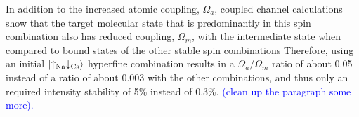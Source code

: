 \documentclass[aps,prl,twocolumn,superscriptaddress]{revtex4-1}
\newcommand{\Na}{\mathrm{Na}}
\newcommand{\Cs}{\mathrm{Cs}}
\begin{document}
In addition to the increased atomic coupling, $ \Omega_a $,
coupled channel calculations show that the target molecular state
that is predominantly in this spin combination also has reduced coupling, $ \Omega_m $,
with the intermediate state when compared to bound states of the other stable spin combinations
Therefore, using an initial $\ket{\uparrow_{\Na} \downarrow_{\Cs}}$ hyperfine combination
results in a $ \Omega_a/\Omega_m$ ratio of about 0.05 instead of a ratio of about 0.003
with the other combinations,
and thus only an required intensity stability of 5\% instead of 0.3\%.
\textcolor{blue}{(clean up the paragraph some more).} %
\end{document}
